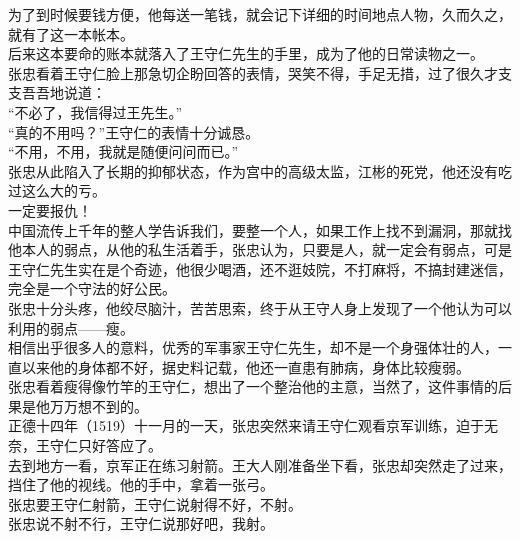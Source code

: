 \begin{multicols}{\theparacolNo}
为了到时候要钱方便，他每送一笔钱，就会记下详细的时间地点人物，久而久之，就有了这一本帐本。\\

后来这本要命的账本就落入了王守仁先生的手里，成为了他的日常读物之一。\\

张忠看着王守仁脸上那急切企盼回答的表情，哭笑不得，手足无措，过了很久才支支吾吾地说道：\\

“不必了，我信得过王先生。”\\

“真的不用吗？”王守仁的表情十分诚恳。\\

“不用，不用，我就是随便问问而已。”\\

张忠从此陷入了长期的抑郁状态，作为宫中的高级太监，江彬的死党，他还没有吃过这么大的亏。\\

一定要报仇！\\

中国流传上千年的整人学告诉我们，要整一个人，如果工作上找不到漏洞，那就找他本人的弱点，从他的私生活着手，张忠认为，只要是人，就一定会有弱点，可是王守仁先生实在是个奇迹，他很少喝酒，还不逛妓院，不打麻将，不搞封建迷信，完全是一个守法的好公民。\\

张忠十分头疼，他绞尽脑汁，苦苦思索，终于从王守人身上发现了一个他认为可以利用的弱点——瘦。\\

相信出乎很多人的意料，优秀的军事家王守仁先生，却不是一个身强体壮的人，一直以来他的身体都不好，据史料记载，他还一直患有肺病，身体比较瘦弱。\\

张忠看着瘦得像竹竿的王守仁，想出了一个整治他的主意，当然了，这件事情的后果是他万万想不到的。\\

正德十四年（1519）十一月的一天，张忠突然来请王守仁观看京军训练，迫于无奈，王守仁只好答应了。\\

去到地方一看，京军正在练习射箭。王大人刚准备坐下看，张忠却突然走了过来，挡住了他的视线。他的手中，拿着一张弓。\\

张忠要王守仁射箭，王守仁说射得不好，不射。\\

张忠说不射不行，王守仁说那好吧，我射。\\


\end{multicols}
